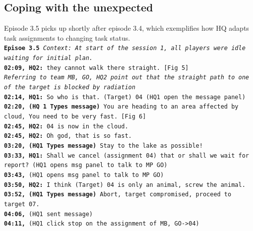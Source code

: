 \subsection{Coping with the unexpected}
Episode 3.5 picks up shortly after episode 3.4, which exemplifies how HQ adapts task assignments to changing task status. \\

\noindent\texttt{\textbf{Episoe 3.5}
\emph{Context: At start of the session 1, all players were idle waiting for initial plan.}\\
\textbf{02:09, HQ2:} they cannot walk there straight. [Fig 5]\\
\emph{Referring to team MB, GO, HQ2 point out that the straight path to one of the target is blocked by radiation}\\
\textbf{02:14, HQ1:} So who is that. (Target) 04 (HQ1 open the message panel) \\
\textbf{02:20, (HQ 1 Types message)}  You are heading to an area affected by cloud, You need to be very fast. [Fig 6] \\
\textbf{02:45, HQ2:} 04 is now in the cloud. \\
\textbf{02:45, HQ2:} Oh god, that is so fast.\\
\textbf{03:20, (HQ1 Types message)} Stay to the lake as possible!\\
\textbf{03:33, HQ1:} Shall we cancel (assignment 04) that or shall we wait for report? (HQ1 opens msg panel to talk to MP GO)\\
\textbf{03:43,} (HQ1 opens msg panel to talk to MP GO) \\
\textbf{03:50, HQ2:} I think (Target) 04 is only an animal, screw the animal.  \\
\textbf{03:52, (HQ1 Types message)} Abort, target compromised, proceed to target 07. \\
\textbf{04:06, } (HQ1 sent message)\\
\textbf{04:11, } (HQ1 click stop on the assignment of MB, GO->04)\\
}

